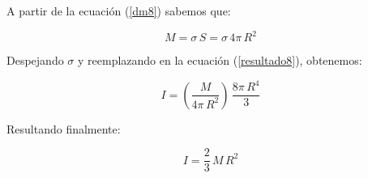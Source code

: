 \documentclass[letter,11pt]{article}
\begin{document}
A partir de la ecuación (\ref{dm8}) sabemos que:

\begin{equation*}
    M = \sigma\, S = \sigma\, 4\pi\, R^2
\end{equation*}

Despejando $\sigma$ y reemplazando en la ecuación (\ref{resultado8}), obtenemos:

\begin{equation*}
    I = (\frac{M}{4\pi\, R^2})\, \frac{8\pi\, R^4}{3}
\end{equation*}

Resultando finalmente:

\begin{equation}
    I = \frac{2}{3}\, M\, R^2
\end{equation}
\end{document}
